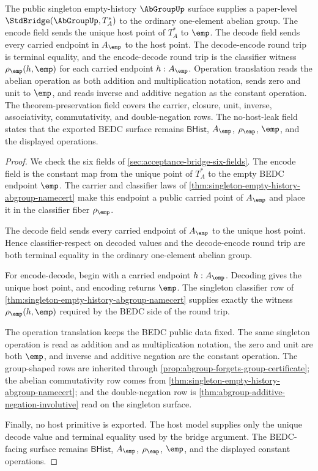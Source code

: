 \begin{theorem}
\label{thm:abgroup-singleton-terminal-standard-bridge}
The public singleton empty-history $\AbGroupUp$ surface supplies a paper-level
$\StdBridge(\AbGroupUp,T_A^\ast)$ to the ordinary one-element abelian group.
The encode field sends the unique host point of $T_A^\ast$ to $\emp$. The
decode field sends every carried endpoint in $A_{\emp}$ to the host point. The
decode-encode round trip is terminal equality, and the encode-decode round trip
is the classifier witness $\rho_{\emp}(h,\emp)$ for each carried endpoint
$h:A_{\emp}$. Operation translation reads the abelian operation as both
addition and multiplication notation, sends zero and unit to $\emp$, and reads
inverse and additive negation as the constant operation. The theorem-preservation
field covers the carrier, closure, unit, inverse, associativity, commutativity,
and double-negation rows. The no-host-leak field states that the exported BEDC
surface remains $\mathsf{BHist}$, $A_{\emp}$, $\rho_{\emp}$, $\emp$, and the
displayed operations.
\end{theorem}
\begin{proof}
We check the six fields of \autoref{sec:acceptance-bridge-six-fields}. The
encode field is the constant map from the unique point of $T_A^\ast$ to the
empty BEDC endpoint $\emp$. The carrier and classifier laws of
\autoref{thm:singleton-empty-history-abgroup-namecert} make this endpoint a
public carried point of $A_{\emp}$ and place it in the classifier fiber
$\rho_{\emp}$.

The decode field sends every carried endpoint of $A_{\emp}$ to the unique host
point. Hence classifier-respect on decoded values and the decode-encode round
trip are both terminal equality in the ordinary one-element abelian group.

For encode-decode, begin with a carried endpoint $h:A_{\emp}$. Decoding gives
the unique host point, and encoding returns $\emp$. The singleton classifier row
of \autoref{thm:singleton-empty-history-abgroup-namecert} supplies exactly the
witness $\rho_{\emp}(h,\emp)$ required by the BEDC side of the round trip.

The operation translation keeps the BEDC public data fixed. The same singleton
operation is read as addition and as multiplication notation, the zero and unit
are both $\emp$, and inverse and additive negation are the constant operation.
The group-shaped rows are inherited through
\autoref{prop:abgroup-forgets-group-certificate}; the abelian commutativity row
comes from \autoref{thm:singleton-empty-history-abgroup-namecert}; and the
double-negation row is \autoref{thm:abgroup-additive-negation-involutive} read on
the singleton surface.

Finally, no host primitive is exported. The host model supplies only the unique
decode value and terminal equality used by the bridge argument. The BEDC-facing
surface remains $\mathsf{BHist}$, $A_{\emp}$, $\rho_{\emp}$, $\emp$, and the
displayed constant operations.
\end{proof}

